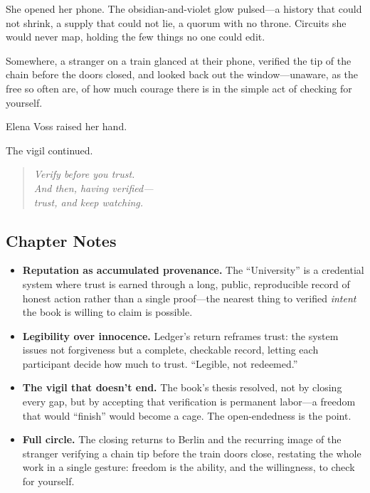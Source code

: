 She opened her phone. The obsidian-and-violet glow pulsed---a history that could
not shrink, a supply that could not lie, a quorum with no throne. Circuits she
would never map, holding the few things no one could edit.

Somewhere, a stranger on a train glanced at their phone, verified the tip of the
chain before the doors closed, and looked back out the window---unaware, as the
free so often are, of how much courage there is in the simple act of checking for
yourself.

Elena Voss raised her hand.

The vigil continued.

\begin{quote}
\itshape Verify before you trust.\\
And then, having verified---\\
trust, and keep watching.
\end{quote}

\hypertarget{chapter-15-notes}{%
\subsection{Chapter Notes}\label{chapter-15-notes}}

\begin{itemize}
\tightlist
\item
  \textbf{Reputation as accumulated provenance.} The ``University'' is a
  credential system where trust is earned through a long, public, reproducible
  record of honest action rather than a single proof---the nearest thing to
  verified \emph{intent} the book is willing to claim is possible.
\item
  \textbf{Legibility over innocence.} Ledger's return reframes trust: the system
  issues not forgiveness but a complete, checkable record, letting each
  participant decide how much to trust. ``Legible, not redeemed.''
\item
  \textbf{The vigil that doesn't end.} The book's thesis resolved, not by closing
  every gap, but by accepting that verification is permanent labor---a freedom
  that would ``finish'' would become a cage. The open-endedness is the point.
\item
  \textbf{Full circle.} The closing returns to Berlin and the recurring image of
  the stranger verifying a chain tip before the train doors close, restating the
  whole work in a single gesture: freedom is the ability, and the willingness, to
  check for yourself.
\end{itemize}
